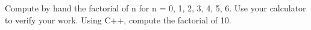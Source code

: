Compute by hand the factorial of n for n = 0, 1, 2, 3, 4, 5, 6. Use your calculator to verify your work. Using C++, compute the factorial of 10.

